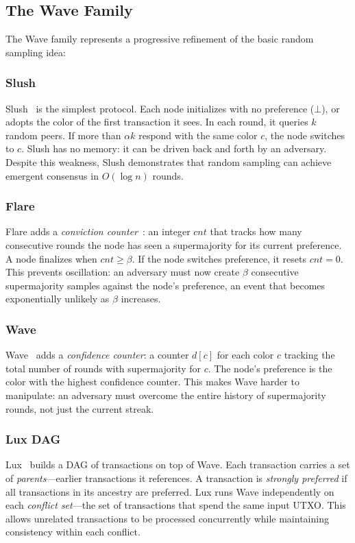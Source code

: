 \documentclass[11pt,a4paper]{article}
\begin{document}
\subsection{The Wave Family}

The Wave family represents a progressive refinement of the basic random sampling idea:

\subsubsection{Slush}
Slush~\cite{rocket2019wave} is the simplest protocol. Each node initializes with no
preference ($\bot$), or adopts the color of the first transaction it sees. In each round,
it queries $k$ random peers. If more than $\alpha k$ respond with the same color $c$, the
node switches to $c$. Slush has no memory: it can be driven back and forth by an adversary.
Despite this weakness, Slush demonstrates that random sampling can achieve emergent
consensus in $O(\log n)$ rounds.

\subsubsection{Flare}
Flare adds a \emph{conviction counter}~\cite{rocket2019wave}: an integer $cnt$
that tracks how many consecutive rounds the node has seen a supermajority for its current
preference. A node finalizes when $cnt \geq \beta$. If the node switches preference, it
resets $cnt = 0$. This prevents oscillation: an adversary must now create $\beta$
consecutive supermajority samples against the node's preference, an event that becomes
exponentially unlikely as $\beta$ increases.

\subsubsection{Wave}
Wave~\cite{rocket2019wave} adds a \emph{confidence counter}: a counter $d[c]$ for
each color $c$ tracking the total number of rounds with supermajority for $c$. The node's
preference is the color with the highest confidence counter. This makes Wave harder to
manipulate: an adversary must overcome the entire history of supermajority rounds, not just
the current streak.

\subsubsection{Lux DAG}
Lux~\cite{rocket2019wave} builds a DAG of transactions on top of Wave. Each
transaction carries a set of \emph{parents}---earlier transactions it references. A
transaction is \emph{strongly preferred} if all transactions in its ancestry are preferred.
Lux runs Wave independently on each \emph{conflict set}---the set of transactions
that spend the same input UTXO. This allows unrelated transactions to be processed
concurrently while maintaining consistency within each conflict.
\end{document}
